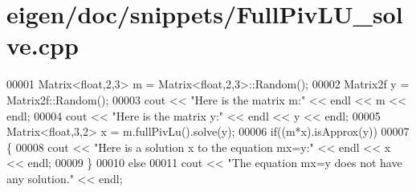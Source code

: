 \hypertarget{eigen_2doc_2snippets_2_full_piv_l_u__solve_8cpp_source}{}\section{eigen/doc/snippets/\+Full\+Piv\+L\+U\+\_\+solve.cpp}
\label{eigen_2doc_2snippets_2_full_piv_l_u__solve_8cpp_source}

\begin{DoxyCode}
00001 Matrix<float,2,3> m = Matrix<float,2,3>::Random();
00002 Matrix2f y = Matrix2f::Random();
00003 cout << \textcolor{stringliteral}{"Here is the matrix m:"} << endl << m << endl;
00004 cout << \textcolor{stringliteral}{"Here is the matrix y:"} << endl << y << endl;
00005 Matrix<float,3,2> x = m.fullPivLu().solve(y);
00006 \textcolor{keywordflow}{if}((m*x).isApprox(y))
00007 \{
00008   cout << \textcolor{stringliteral}{"Here is a solution x to the equation mx=y:"} << endl << x << endl;
00009 \}
00010 \textcolor{keywordflow}{else}
00011   cout << \textcolor{stringliteral}{"The equation mx=y does not have any solution."} << endl;
\end{DoxyCode}

